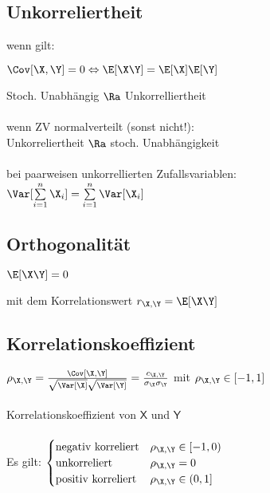 \documentclass[german,color,6pt]{latex4ei/latex4ei_sheet}
\begin{document}
\begin{sectionbox}
	\subsection{Unkorreliertheit}
	wenn gilt:
	\begin{emphbox}
		$\Cov [\X,\Y] = 0 \Leftrightarrow \E[\X\Y] = \E[\X] \E[\Y]$
	\end{emphbox}
	Stoch. Unabhängig $\Ra$ Unkorrelliertheit \\\\
	wenn ZV normalverteilt (sonst nicht!):\\
	Unkorreliertheit $\Ra$ stoch. Unabhängigkeit\\\\
	bei paarweisen unkorrellierten Zufallsvariablen:\\
	$\Var[\sum \limits_{i=1}^{n} \X_i] = \sum \limits_{i=1}^{n} \Var [\X_i]$
\end{sectionbox}

\begin{sectionbox}
	\subsection{Orthogonalität}

	\begin{emphbox}
		$\E[\X\Y] = 0$
	\end{emphbox}
	mit dem Korrelationswert $ r_{\X,\Y} = \E[\X\Y]$

\end{sectionbox}

\begin{sectionbox}
	\subsection{Korrelationskoeffizient}
	$\rho_{\X,\Y} = \frac{\Cov[\X,\Y]}{\sqrt{\Var[\X]} \sqrt{\Var[\Y]}} = \frac{c_{\X,\Y}}{\sigma_{\X} \sigma_{\Y}}$ mit $\rho_{\X, \Y} \in [-1,1]$\\ \\
	Korrelationskoeffizient von $\mathsf X$ und $\mathsf Y$\\\\
	Es gilt: $\begin{cases}\text{negativ korreliert} & \rho_{\mathsf{\X,\Y}}\in [-1,0) \\
	\text{unkorreliert} & \rho_{\mathsf{\X,\Y}}=0 \\
	\text{positiv korreliert} & \rho_{\mathsf{\X,\Y}}\in (0,1]\end{cases}$
\end{sectionbox}
\end{document}
